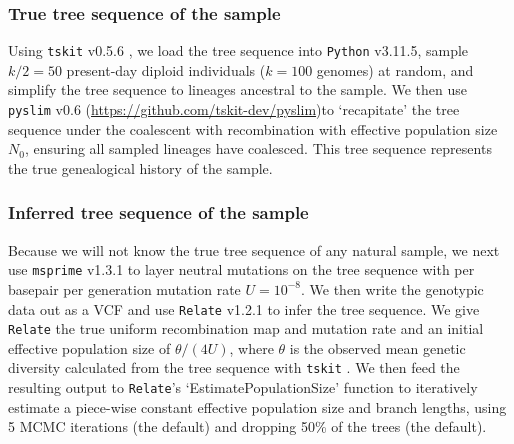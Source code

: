 \documentclass[12pt]{article}
\begin{document}

\subsubsection*{True tree sequence of the sample}

Using \texttt{tskit} v0.5.6 \citep{kelleher2018efficient}, we load the tree sequence into \texttt{Python} v3.11.5, sample $k/2=50$ present-day diploid individuals ($k=100$ genomes) at random, and simplify the tree sequence to lineages ancestral to the sample.
We then use \texttt{pyslim} v0.6 (\url{https://github.com/tskit-dev/pyslim})to `recapitate' the tree sequence under the coalescent with recombination \citep{hudson2002generating} with effective population size $N_0$, ensuring all sampled lineages have coalesced.
This tree sequence represents the true genealogical history of the sample.

\subsubsection*{Inferred tree sequence of the sample}

Because we will not know the true tree sequence of any natural sample, we next use \texttt{msprime} v1.3.1 \citep{kelleher2016efficient} to layer neutral mutations on the tree sequence with per basepair per generation mutation rate $U=10^{-8}$.
We then write the genotypic data out as a VCF and use \texttt{Relate} v1.2.1 \citep{speidel2019method} to infer the tree sequence.
We give \texttt{Relate} the true uniform recombination map and mutation rate and an initial effective population size of $\theta/(4U)$, where $\theta$ is the observed mean genetic diversity calculated from the tree sequence with \texttt{tskit} \citep{ralph2020efficiently}.
We then feed the resulting output to \texttt{Relate}'s `EstimatePopulationSize' function to iteratively estimate a piece-wise constant effective population size and branch lengths, using 5 MCMC iterations (the default) and dropping 50\% of the trees (the default).
\end{document}
